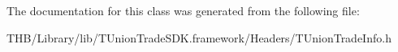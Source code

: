 The documentation for this class was generated from the following file\+:\begin{DoxyCompactItemize}
\item 
T\+H\+B/\+Library/lib/\+T\+Union\+Trade\+S\+D\+K.\+framework/\+Headers/T\+Union\+Trade\+Info.\+h\end{DoxyCompactItemize}
